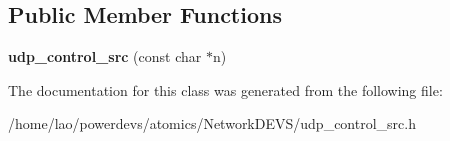 \subsection*{Public Member Functions}
\begin{DoxyCompactItemize}
\item 
{\bfseries udp\+\_\+control\+\_\+src} (const char $\ast$n)\hypertarget{classudp__control__src_a40abd75549f525a16f006a54a9ffb87b}{}\label{classudp__control__src_a40abd75549f525a16f006a54a9ffb87b}

\end{DoxyCompactItemize}


The documentation for this class was generated from the following file\+:\begin{DoxyCompactItemize}
\item 
/home/lao/powerdevs/atomics/\+Network\+D\+E\+V\+S/udp\+\_\+control\+\_\+src.\+h\end{DoxyCompactItemize}
